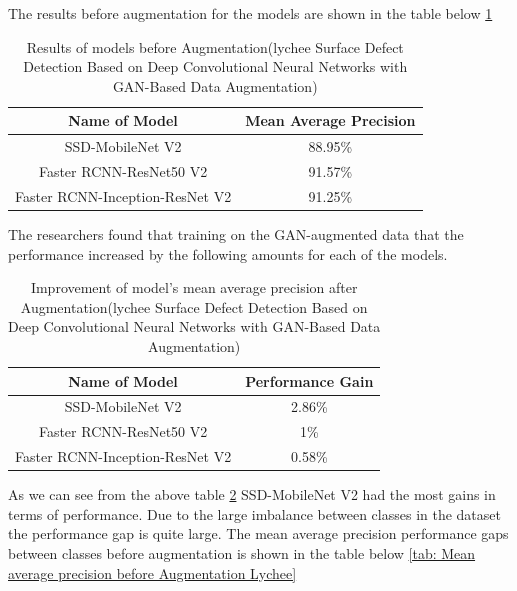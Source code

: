 The results before augmentation for the models are shown in the table below \ref{tab:Results of models before Augmentation Lychee}
\begin{table}[H]
    \centering
    {\begin{tabular}{|c|c|}
         \hline
         Name of Model
         & Mean Average Precision\\
         \hline
         SSD-MobileNet V2 & 88.95\%\\
         Faster RCNN-ResNet50 V2 & 91.57\%\\
         Faster RCNN-Inception-ResNet V2 & 91.25\%\\
         \hline
        \end{tabular}}
    \caption{Results of models before Augmentation(lychee Surface Defect Detection Based on Deep Convolutional
Neural Networks with GAN-Based Data Augmentation)\cite{litReviewLychee}}
    \label{tab:Results of models before Augmentation Lychee}
\end{table}
The researchers found that training on the GAN-augmented data that the performance increased by the following amounts for each of the models.
\begin{table}[H]
    \centering
    {\begin{tabular}{|c|c|}
         \hline
         Name of Model
         & Performance Gain\\
         \hline
         SSD-MobileNet V2 & 2.86\%\\
         Faster RCNN-ResNet50 V2 & 1\%\\
         Faster RCNN-Inception-ResNet V2 & 0.58\%\\
         \hline
        \end{tabular}}
    \caption{Improvement of model's mean average precision after Augmentation(lychee Surface Defect Detection Based on Deep Convolutional
Neural Networks with GAN-Based Data Augmentation)\cite{litReviewLychee}}
    \label{tab:Improvement of model accuracy after Augmentation Lychee}
\end{table}
As we can see from the above table \ref{tab:Improvement of model accuracy after Augmentation Lychee} SSD-MobileNet V2 had the most gains in terms of performance.  Due to the large imbalance between classes in the dataset the performance gap is quite large.  The mean average precision performance gaps between classes before augmentation is shown in the table below \ref{tab: Mean average precision before Augmentation Lychee}
